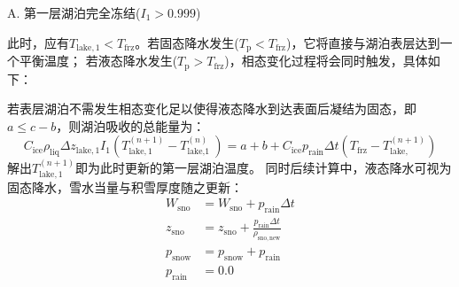 A. 第一层湖泊完全冻结($I_1>0.999$)

此时，应有$T_{\mathrm{lake,1}}<T_{\mathrm {frz}} $。若固态降水发生($T_{\mathrm {p}} <T_{\mathrm {frz}} $)，它将直接与湖泊表层达到一个平衡温度；
若液态降水发生($T_{\mathrm {p}} >T_{\mathrm {frz}} $)，相态变化过程将会同时触发，具体如下：

若表层湖泊不需发生相态变化足以使得液态降水到达表面后凝结为固态，即$a\leqslant c-b$，则湖泊吸收的总能量为：
\begin{equation}
  C_{\mathrm{ice}} \rho_{\mathrm{liq}} \Delta z_{\mathrm{lake,1}} I_{1}\left(T_{\mathrm{lake, 1}}^{(n+1)}-T_{\text {lake,1 }}^{(n)}\right)=a+b+C_{\mathrm{ice}} p_{\mathrm {rain}} \Delta t\left(T_{\mathrm {frz}}-T_{\text {lake, }}^{(n+1)}\right)
\end{equation}
解出$T_{\mathrm{lake,1}}^{\left(n+1\right)}$即为此时更新的第一层湖泊温度。
同时后续计算中，液态降水可视为固态降水，雪水当量与积雪厚度随之更新：
\begin{equation}
  \begin{aligned}
    W_{\mathrm{sno}} &= W_{\mathrm{sno}}+p_{\mathrm {rain}}  \Delta t \\
    z_{\mathrm{sno}} &= z_{\mathrm{sno}}+\frac{p_{\mathrm {rain}}  \Delta t}{\rho_{\mathrm{sno,new}}} \\
    p_{\mathrm {snow}}  &= p_{\mathrm {snow}}  + p_{\mathrm {rain}}  \\
    p_{\mathrm {rain}}  &= 0.0
  \end{aligned}
\end{equation}


